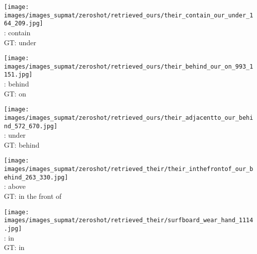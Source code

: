 \documentclass[10pt,twocolumn,letterpaper]{article}
\begin{document}
\begin{figure*}[t]
    \begin{minipage}[t]{0.185\textwidth}
    	\centering
       	\texttt{[image: images/images\_supmat/zeroshot/retrieved\_ours/their\_contain\_our\_under\_164\_209.jpg]}\\
       	\vspace{0.3ex}
       	\cite{Lu16}: contain \\
       	GT: under
       	\vspace{2ex}
    \end{minipage}
    \hspace{0.005\textwidth}
    \begin{minipage}[t]{0.185\textwidth}
    	\centering
       	\texttt{[image: images/images\_supmat/zeroshot/retrieved\_ours/their\_behind\_our\_on\_993\_1151.jpg]}\\
       	\vspace{0.3ex}
       	\cite{Lu16}: behind \\
       	GT: on
       	\vspace{0.2ex}
    \end{minipage}
    \hspace{0.005\textwidth}
    \begin{minipage}[t]{0.185\textwidth}
    	\centering
       	\texttt{[image: images/images\_supmat/zeroshot/retrieved\_ours/their\_adjacentto\_our\_behind\_572\_670.jpg]}\\
		\vspace{0.3ex}       	
       	\cite{Lu16}: under \\
       	GT: behind
       	\vspace{0.2ex}
    \end{minipage}
    \hspace{0.005\textwidth}
    \begin{minipage}[t]{0.185\textwidth}
    	\centering
       	\texttt{[image: images/images\_supmat/zeroshot/retrieved\_their/their\_inthefrontof\_our\_behind\_263\_330.jpg]}\\
		\vspace{0.3ex}       	
       	\cite{Lu16}: above \\
       	GT: in the front of
       	\vspace{0.2ex}
    \end{minipage}
    \hspace{0.005\textwidth}  
    \begin{minipage}[t]{0.185\textwidth}
    	\centering
       	\texttt{[image: images/images\_supmat/zeroshot/retrieved\_their/surfboard\_wear\_hand\_1114.jpg]}\\
		\vspace{0.3ex}       	
       	\cite{Lu16}: in \\
       	GT: in
      	\vspace{0.2ex}
    \end{minipage} 



\end{figure*}
\end{document}
